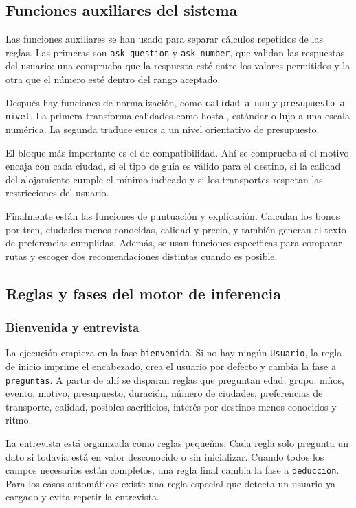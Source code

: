 \documentclass[11pt,a4paper]{article}
\begin{document}
\subsection{Funciones auxiliares del sistema}
Las funciones auxiliares se han usado para separar c\'alculos repetidos de las
reglas. Las primeras son \texttt{ask-question} y \texttt{ask-number}, que
validan las respuestas del usuario: una comprueba que la respuesta est\'e entre
los valores permitidos y la otra que el n\'umero est\'e dentro del rango
aceptado.

Despu\'es hay funciones de normalizaci\'on, como \texttt{calidad-a-num} y
\texttt{presupuesto-a-nivel}. La primera transforma calidades como hostal,
est\'andar o lujo a una escala num\'erica. La segunda traduce euros a un nivel
orientativo de presupuesto.

El bloque m\'as importante es el de compatibilidad. Ah\'i se comprueba si el
motivo encaja con cada ciudad, si el tipo de gu\'ia es v\'alido para el destino,
si la calidad del alojamiento cumple el m\'inimo indicado y si los transportes
respetan las restricciones del usuario.

Finalmente est\'an las funciones de puntuaci\'on y explicaci\'on. Calculan los
bonos por tren, ciudades menos conocidas, calidad y precio, y tambi\'en generan
el texto de preferencias cumplidas. Adem\'as, se usan funciones espec\'ificas
para comparar rutas y escoger dos recomendaciones distintas cuando es posible.

\subsection{Reglas y fases del motor de inferencia}
\subsubsection{Bienvenida y entrevista}
La ejecuci\'on empieza en la fase \texttt{bienvenida}. Si no hay ning\'un
\texttt{Usuario}, la regla de inicio imprime el encabezado, crea el usuario
por defecto y cambia la fase a \texttt{preguntas}. A partir de ah\'i se disparan
reglas que preguntan edad, grupo, ni\~nos, evento, motivo, presupuesto,
duraci\'on, n\'umero de ciudades, preferencias de transporte, calidad, posibles
sacrificios, inter\'es por destinos menos conocidos y ritmo.

La entrevista est\'a organizada como reglas peque\~nas. Cada regla solo pregunta
un dato si todav\'ia est\'a en valor desconocido o sin inicializar. Cuando todos
los campos necesarios est\'an completos, una regla final cambia la fase a
\texttt{deduccion}. Para los casos autom\'aticos existe una regla especial que
detecta un usuario ya cargado y evita repetir la entrevista.
\end{document}
